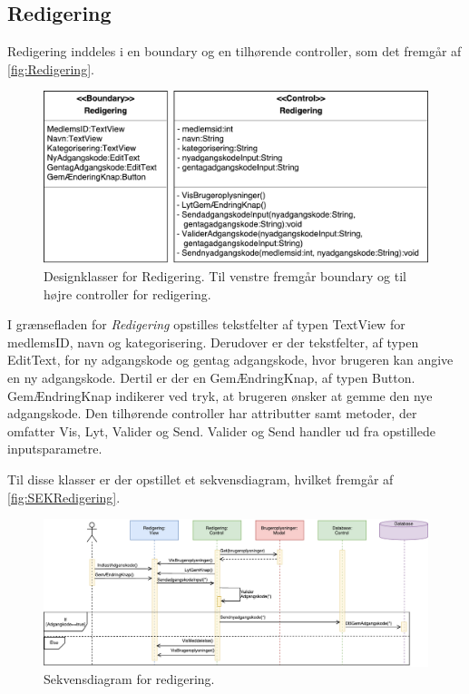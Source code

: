 \subsection*{Redigering}
Redigering inddeles i en boundary og en tilhørende controller, som det fremgår af \autoref{fig:Redigering}. 

\begin{figure} [H]
\centering
\includegraphics[width=1\textwidth]{figures/MVC/Redigering}
\caption{Designklasser for Redigering. Til venstre fremgår boundary og til højre controller for redigering.}
\label{fig:Redigering}
\end{figure}

\noindent
I grænsefladen for \textit{Redigering} opstilles tekstfelter af typen TextView for medlemsID, navn og kategorisering. Derudover er der tekstfelter, af typen EditText, for ny adgangskode og gentag adgangskode, hvor brugeren kan angive en ny adgangskode. Dertil er der en GemÆndringKnap, af typen Button. GemÆndringKnap indikerer ved tryk, at brugeren ønsker at gemme den nye adgangskode. 
Den tilhørende controller har attributter samt metoder, der omfatter Vis, Lyt, Valider og Send. Valider og Send handler ud fra opstillede inputsparametre. 


Til disse klasser er der opstillet et sekvensdiagram, hvilket fremgår af \autoref{fig:SEKRedigering}.


\begin{figure} [H]
\centering
\includegraphics[width=1\textwidth]{figures/Sek/SEKRedigering}
\caption{Sekvensdiagram for redigering.}
\label{fig:SEKRedigering}
\end{figure}

